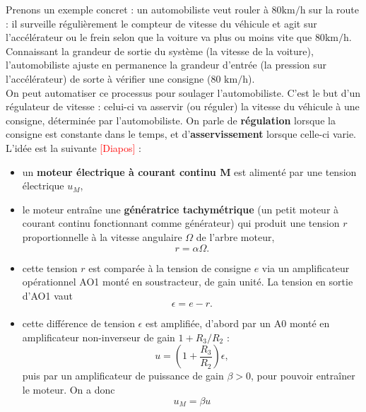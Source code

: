 \documentclass[11pt,a4paper]{report}
\begin{document}
Prenons un exemple concret : un automobiliste veut rouler à $80 \text{km}/\text{h}$ sur la route : il surveille régulièrement le compteur de vitesse du véhicule et agit sur l'accélérateur ou le frein selon que la voiture va plus ou moins vite que $80 \text{km}/\text{h}$. Connaissant la grandeur de sortie du système (la vitesse de la voiture), l'automobiliste ajuste en permanence la grandeur d'entrée (la pression sur l'accélérateur) de sorte à vérifier une consigne (80 $\text{km}/\text{h}$).\\

On peut automatiser ce processus pour soulager l'automobiliste. C'est le but d'un régulateur de vitesse : celui-ci va asservir (ou réguler) la vitesse du véhicule à une consigne, déterminée par l'automobiliste. On parle de \textbf{régulation} lorsque la consigne est constante dans le temps, et d'\textbf{asservissement} lorsque celle-ci varie.\\

L'idée est la suivante \textcolor{red}{[Diapos]} :
\begin{itemize}
	\item un \textbf{moteur électrique à courant continu M} est alimenté par une tension électrique $u_M$,
	\item le moteur entraîne une \textbf{génératrice tachymétrique} (un petit moteur à courant continu fonctionnant comme générateur) qui produit une tension $r$ proportionnelle à la vitesse angulaire $\Omega$ de l'arbre moteur,
	\begin{equation}
		r = \alpha \Omega.
	\end{equation}
	\item cette tension $r$ est comparée à la tension de consigne $e$ via un amplificateur opérationnel AO1 monté en soustracteur, de gain unité. La tension en sortie d'AO1 vaut
	\begin{equation}
		\epsilon = e - r.
	\end{equation}
	\item cette différence de tension $\epsilon$ est amplifiée, d'abord par un A0 monté en amplificateur non-inverseur de gain $1 + R_3/R_2$ :
	\begin{equation}
		u = \left(1 + \frac{R_3}{R_2}\right)\epsilon,
	\end{equation}
	puis par un amplificateur de puissance de gain $\beta > 0$, pour pouvoir entraîner le moteur. On a donc
	\begin{equation}
		u_M = \beta u
	\end{equation}
\end{itemize}
\end{document}
